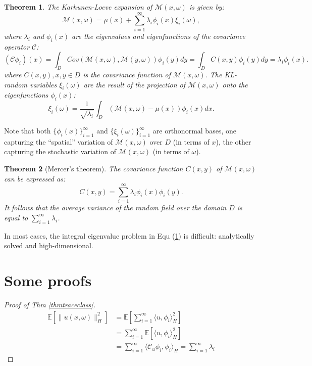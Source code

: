 \documentclass{article}
\newtheorem{theorem}{Theorem}
\begin{document}
\begin{theorem}\label{KL-expansion}
    The Karhunen-Loeve expansion of $\mathcal{M}(x, \omega)$ is given by:
    \begin{equation}
        \mathcal{M}(x, \omega) = \mu(x) + \sum_{i=1}^{\infty} \lambda_i \phi_i(x) \xi_i(\omega),
    \end{equation}
	where $\lambda_i$ and $\phi_i(x)$ are the eigenvalues and eigenfunctions of the covariance operator $\mathcal{C}$:
\begin{equation}
	(\mathcal{C}\phi_i)(x) =\int_D Cov(\mathcal{M}(x, \omega), \mathcal{M}(y, \omega)) \phi_i(y) dy= \int_D C(x, y) \phi_i(y) dy = \lambda_i \phi_i(x).
\end{equation}
where $C(x,y), x,y\in D$ is the covariance function of $\mathcal{M}(x, \omega)$. The KL-random variables $\xi_i(\omega)$ are the result of the projection of $\mathcal{M}(x, \omega)$ onto the eigenfunctions $\phi_i(x)$:
\begin{equation}
	\xi_i(\omega) = \frac{1}{\sqrt{\lambda_i}}\int_D (\mathcal{M}(x, \omega)-\mu(x)) \phi_i(x) dx.
\end{equation}
\end{theorem}
Note that both $\{\phi_i(x)\}_{i=1}^{\infty}$ and $\{\xi_i(\omega)\}_{i=1}^{\infty}$ are orthonormal bases, 
one capturing the “spatial” variation  of $\mathcal{M}(x, \omega)$ over $D$ (in terms of $x$), 
the other capturing the stochastic variation of $\mathcal{M}(x, \omega)$ (in terms of $\omega$).

\begin{theorem}[Mercer's theorem]
	The covariance function $C(x, y)$ of $\mathcal{M}(x, \omega)$ can be expressed as:
\begin{equation}
	C(x, y) = \sum_{i=1}^{\infty} \lambda_i \phi_i(x) \phi_i(y).
\end{equation}
It follows that the average variance of the random field over the domain $D$ is equal to $\sum_{i=1}^{\infty} \lambda_i$.
\end{theorem}

In most cases, the integral eigenvalue problem in Equ (\ref{KL-expansion}) is difficult: analytically solved and high-dimensional.

\section{Some proofs}
\begin{proof}[Proof of Thm \ref{thmtraceclass}]
\begin{equation}
  \begin{aligned}
    \mathbb{E}\left[\|u(x, \omega)\|^2_H\right] &= \mathbb{E} \left[\sum_{i=1}^\infty \langle u, \phi_i\rangle_H^2\right]\\
    &= \sum_{i=1}^\infty \mathbb{E} \left[\langle u, \phi_i\rangle_H^2\right]\\
    &= \sum_{i=1}^\infty \langle \mathcal{C}_u  \phi_i, \phi_i\rangle_H= \sum_{i=1}^\infty \lambda_i
  \end{aligned}
\end{equation}
\end{proof}
\end{document}
